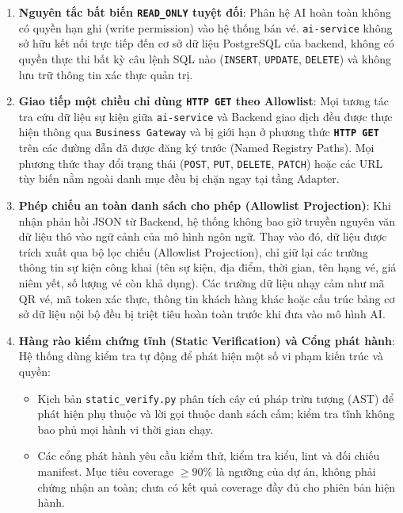\begin{enumerate}[nosep]
  \item \textbf{Nguyên tắc bất biến \texttt{READ\_ONLY} tuyệt đối}:
  Phân hệ AI hoàn toàn không có quyền hạn ghi (write permission) vào hệ thống bán vé. \texttt{ai-service} không sở hữu kết nối trực tiếp đến cơ sở dữ liệu PostgreSQL của backend, không có quyền thực thi bất kỳ câu lệnh SQL nào (\texttt{INSERT}, \texttt{UPDATE}, \texttt{DELETE}) và không lưu trữ thông tin xác thực quản trị.

  \item \textbf{Giao tiếp một chiều chỉ dùng \texttt{HTTP GET} theo Allowlist}:
  Mọi tương tác tra cứu dữ liệu sự kiện giữa \texttt{ai-service} và Backend giao dịch đều được thực hiện thông qua \texttt{Business Gateway} và bị giới hạn ở phương thức \textbf{\texttt{HTTP GET}} trên các đường dẫn đã được đăng ký trước (Named Registry Paths). Mọi phương thức thay đổi trạng thái (\texttt{POST}, \texttt{PUT}, \texttt{DELETE}, \texttt{PATCH}) hoặc các URL tùy biến nằm ngoài danh mục đều bị chặn ngay tại tầng Adapter.

  \item \textbf{Phép chiếu an toàn danh sách cho phép (Allowlist Projection)}:
  Khi nhận phản hồi JSON từ Backend, hệ thống không bao giờ truyền nguyên văn dữ liệu thô vào ngữ cảnh của mô hình ngôn ngữ. Thay vào đó, dữ liệu được trích xuất qua bộ lọc chiếu (Allowlist Projection), chỉ giữ lại các trường thông tin sự kiện công khai (tên sự kiện, địa điểm, thời gian, tên hạng vé, giá niêm yết, số lượng vé còn khả dụng). Các trường dữ liệu nhạy cảm như mã QR vé, mã token xác thực, thông tin khách hàng khác hoặc cấu trúc bảng cơ sở dữ liệu nội bộ đều bị triệt tiêu hoàn toàn trước khi đưa vào mô hình AI.

  \item \textbf{Hàng rào kiểm chứng tĩnh (Static Verification) và Cổng phát hành}:
  Hệ thống dùng kiểm tra tự động để phát hiện một số vi phạm kiến trúc và quyền:
  \begin{itemize}[nosep]
    \item Kịch bản \texttt{static\_verify.py} phân tích cây cú pháp trừu tượng (AST) để phát hiện phụ thuộc và lời gọi thuộc danh sách cấm; kiểm tra tĩnh không bao phủ mọi hành vi thời gian chạy.
    \item Các cổng phát hành yêu cầu kiểm thử, kiểm tra kiểu, lint và đối chiếu manifest. Mục tiêu coverage $\ge 90\%$ là ngưỡng của dự án, không phải chứng nhận an toàn; chưa có kết quả coverage đầy đủ cho phiên bản hiện hành.
  \end{itemize}
\end{enumerate}

